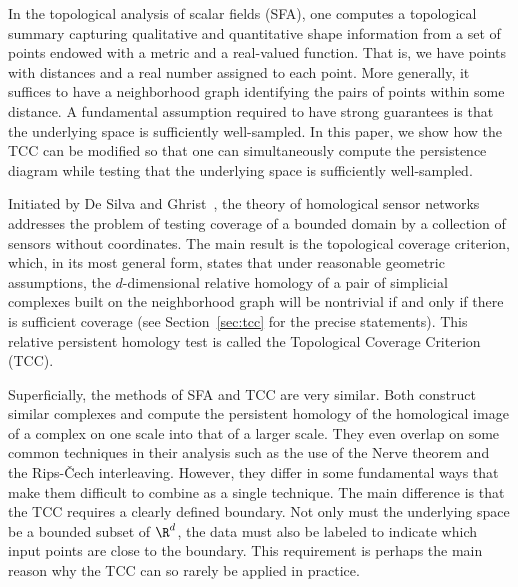 
In the topological analysis of scalar fields (SFA), one computes a topological summary capturing qualitative and quantitative shape information from a set of points endowed with a metric and a real-valued function.
That is, we have points with distances and a real number assigned to each point.
More generally, it suffices to have a neighborhood graph identifying the pairs of points within some distance.
A fundamental assumption required to have strong guarantees is that the underlying space is sufficiently well-sampled.
In this paper, we show how the TCC can be modified so that one can simultaneously compute the persistence diagram while testing that the underlying space is sufficiently well-sampled.

Initiated by De Silva and Ghrist~\cite{desilva06coordinate,desilva07coverage,desilva07homological}, the theory of homological sensor networks addresses the problem of testing coverage of a bounded domain by a collection of sensors without coordinates.
The main result is the topological coverage criterion, which, in its most general form, states that under reasonable geometric assumptions, the $d$-dimensional relative homology of a pair of simplicial complexes built on the neighborhood graph will be nontrivial if and only if there is sufficient coverage (see Section~\ref{sec:tcc} for the precise statements).
This relative persistent homology test is called the Topological Coverage Criterion (TCC).

Superficially, the methods of SFA and TCC are very similar.
Both construct similar complexes and compute the persistent homology of the homological image of a complex on one scale into that of a larger scale.
They even overlap on some common techniques in their analysis such as the use of the Nerve theorem and the Rips-\v{C}ech interleaving.
However, they differ in some fundamental ways that make them difficult to combine as a single technique.
The main difference is that the TCC requires a clearly defined boundary.
Not only must the underlying space be a bounded subset of $\R^d$, the data must also be labeled to indicate which input points are close to the boundary.
This requirement is perhaps the main reason why the TCC can so rarely be applied in practice.

